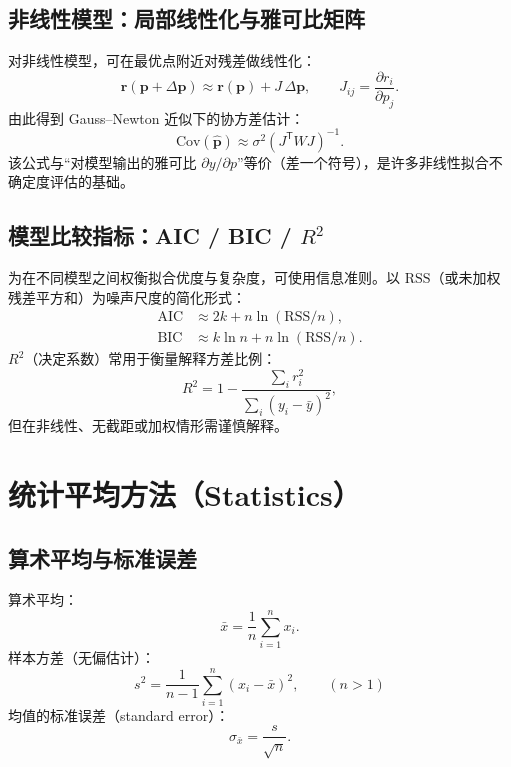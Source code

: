 \documentclass[UTF8,a4paper,11pt]{ctexart}
\begin{document}
\subsection{非线性模型：局部线性化与雅可比矩阵}

对非线性模型，可在最优点附近对残差做线性化：
\begin{equation}
\bm{r}(\bm{p}+\Delta\bm{p})\approx \bm{r}(\bm{p}) + J\,\Delta\bm{p},\qquad
J_{ij}=\frac{\partial r_i}{\partial p_j}.
\end{equation}
由此得到 Gauss--Newton 近似下的协方差估计：
\begin{equation}
\mathrm{Cov}(\hat{\bm{p}})\approx \sigma^2 (J^\mathsf{T}WJ)^{-1}.
\end{equation}
该公式与“对模型输出的雅可比 $\partial y/\partial p$”等价（差一个符号），是许多非线性拟合不确定度评估的基础。

\subsection{模型比较指标：AIC / BIC / $R^2$}

为在不同模型之间权衡拟合优度与复杂度，可使用信息准则。以 $\mathrm{RSS}$（或未加权残差平方和）为噪声尺度的简化形式：
\begin{align}
\mathrm{AIC} &\approx 2k + n\ln(\mathrm{RSS}/n),\\
\mathrm{BIC} &\approx k\ln n + n\ln(\mathrm{RSS}/n).
\end{align}
$R^2$（决定系数）常用于衡量解释方差比例：
\begin{equation}
R^2 = 1-\frac{\sum_i r_i^2}{\sum_i (y_i-\bar{y})^2},
\end{equation}
但在非线性、无截距或加权情形需谨慎解释。

\section{统计平均方法（Statistics）}

\subsection{算术平均与标准误差}

算术平均：
\begin{equation}
\bar{x}=\frac{1}{n}\sum_{i=1}^{n}x_i.
\end{equation}
样本方差（无偏估计）：
\begin{equation}
s^2=\frac{1}{n-1}\sum_{i=1}^{n}(x_i-\bar{x})^2,\qquad (n>1)
\end{equation}
均值的标准误差（standard error）：
\begin{equation}
\sigma_{\bar{x}}=\frac{s}{\sqrt{n}}.
\end{equation}
\end{document}
